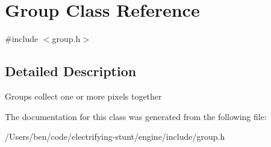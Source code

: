 \hypertarget{class_group}{}\section{Group Class Reference}
\label{class_group}


{\ttfamily \#include $<$group.\+h$>$}



\subsection{Detailed Description}
Groups collect one or more pixels together 

The documentation for this class was generated from the following file\+:\begin{DoxyCompactItemize}
\item 
/\+Users/ben/code/electrifying-\/stunt/engine/include/group.\+h\end{DoxyCompactItemize}
